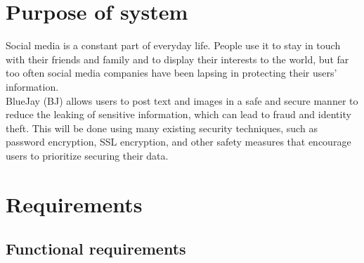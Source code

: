 \documentclass{report}
\begin{document}
\section{Purpose of system}
	Social media is a constant part of everyday life. People use it to stay in touch with their friends and family and to display their interests to the world, but far too often social media companies have been lapsing in protecting their users’ information.\\
	BlueJay (BJ) allows users to post text and images in a safe and secure manner to reduce the leaking of sensitive information, which can lead to fraud and identity theft. This will be done using many existing security techniques, such as password encryption, SSL encryption, and other safety measures that encourage users to prioritize securing their data.
\section{Requirements}
	\subsection{Functional requirements}
\end{document}
